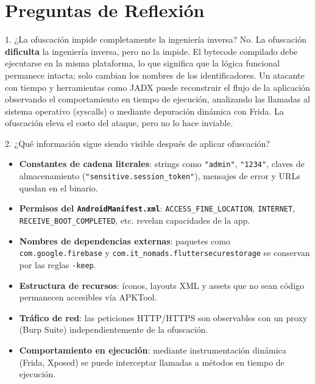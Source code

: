 \documentclass[12pt,a4paper]{article}
\begin{document}
\section{Preguntas de Reflexión}

\begin{reflexion}{1. ¿La ofuscación impide completamente la ingeniería inversa?}
No. La ofuscación \textbf{dificulta} la ingeniería inversa, pero no la impide. El bytecode compilado debe ejecutarse en la misma plataforma, lo que significa que la lógica funcional permanece intacta; solo cambian los nombres de los identificadores. Un atacante con tiempo y herramientas como JADX puede reconstruir el flujo de la aplicación observando el comportamiento en tiempo de ejecución, analizando las llamadas al sistema operativo (syscalls) o mediante depuración dinámica con Frida. La ofuscación eleva el costo del ataque, pero no lo hace inviable.
\end{reflexion}

\begin{reflexion}{2. ¿Qué información sigue siendo visible después de aplicar ofuscación?}
\begin{itemize}[leftmargin=1.2em]
  \item \textbf{Constantes de cadena literales}: strings como \texttt{"admin"}, \texttt{"1234"}, claves de almacenamiento (\texttt{"sensitive.session\_token"}), mensajes de error y URLs quedan en el binario.
  \item \textbf{Permisos del \texttt{AndroidManifest.xml}}: \texttt{ACCESS\_FINE\_LOCATION}, \texttt{INTERNET}, \texttt{RECEIVE\_BOOT\_COMPLETED}, etc. revelan capacidades de la app.
  \item \textbf{Nombres de dependencias externas}: paquetes como \texttt{com.google.firebase} y \texttt{com.it\_nomads.fluttersecurestorage} se conservan por las reglas \texttt{-keep}.
  \item \textbf{Estructura de recursos}: íconos, layouts XML y assets que no sean código permanecen accesibles vía APKTool.
  \item \textbf{Tráfico de red}: las peticiones HTTP/HTTPS son observables con un proxy (Burp Suite) independientemente de la ofuscación.
  \item \textbf{Comportamiento en ejecución}: mediante instrumentación dinámica (Frida, Xposed) se puede interceptar llamadas a métodos en tiempo de ejecución.
\end{itemize}
\end{reflexion}
\end{document}
